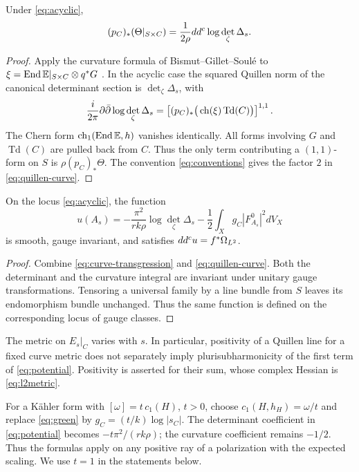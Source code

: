 \begin{lemma}\label{lem:quillen-curve}
Under \eqref{eq:acyclic},
\begin{equation}\label{eq:quillen-curve}
 (p_C)_*(\Theta|_{S\times C})
   =\frac1{2\rho}dd^c\log\det_\zeta\Delta_s.
\end{equation}
\end{lemma}
\begin{proof}
Apply the curvature formula of Bismut--Gillet--Soul\'e to
$\xi=\operatorname{End}\mathbb E|_{S\times C}\otimes q^*G$
\cite[Theorem~1.6, Remark~1.10 and equation~(1.154)]{BGS88}.
In the acyclic case the squared Quillen norm of the canonical determinant
section is $\det_\zeta\Delta_s$, with
\[
 \frac{i}{2\pi}\partial\bar\partial\log\det_\zeta\Delta_s
 =\left[(p_C)_*\big(\operatorname{ch}(\xi)\operatorname{Td}(C)\big)\right]^{1,1}.
\]
The Chern form $\operatorname{ch}_1(\operatorname{End}\mathbb E,h)$ vanishes identically.
All forms involving $G$ and $\operatorname{Td}(C)$ are pulled back from
$C$. Thus the only term contributing a $(1,1)$-form on $S$ is
$\rho(p_C)_*\Theta$. The convention \eqref{eq:conventions} gives the factor
$2$ in \eqref{eq:quillen-curve}.
\end{proof}

\begin{proposition}\label{prop:potential}
On the locus \eqref{eq:acyclic}, the function
\begin{equation}\label{eq:potential}
 u(A_s)=-\frac{\pi^2}{rk\rho}\log\det_\zeta\Delta_s
        -\frac12\int_Xg_C|F_{A_s}^0|^2dV_X
\end{equation}
is smooth, gauge invariant, and satisfies $dd^c u=f^*\Omega_{L^2}$.
\end{proposition}
\begin{proof}
Combine \eqref{eq:curve-transgression} and \eqref{eq:quillen-curve}.
Both the determinant and the curvature integral are invariant under unitary
gauge transformations. Tensoring a universal family by a line bundle from
$S$ leaves its endomorphism bundle unchanged. Thus the same function is
defined on the corresponding locus of gauge classes.
\end{proof}

The metric on $E_s|_C$ varies with $s$. In particular, positivity of a
Quillen line for a fixed curve metric does not separately imply
plurisubharmonicity of the first term of \eqref{eq:potential}.
Positivity is asserted for their sum, whose complex Hessian is \eqref{eq:l2metric}.

For a K\"ahler form with $[\omega]=t\,c_1(H)$, $t>0$, choose
$c_1(H,h_H)=\omega/t$ and replace \eqref{eq:green} by
$g_C=(t/k)\log|s_C|$.
The determinant coefficient in \eqref{eq:potential} becomes
$-t\pi^2/(rk\rho)$; the curvature coefficient remains $-1/2$.
Thus the formulas apply on any positive ray of a polarization with the
expected scaling. We use $t=1$ in the statements below.

